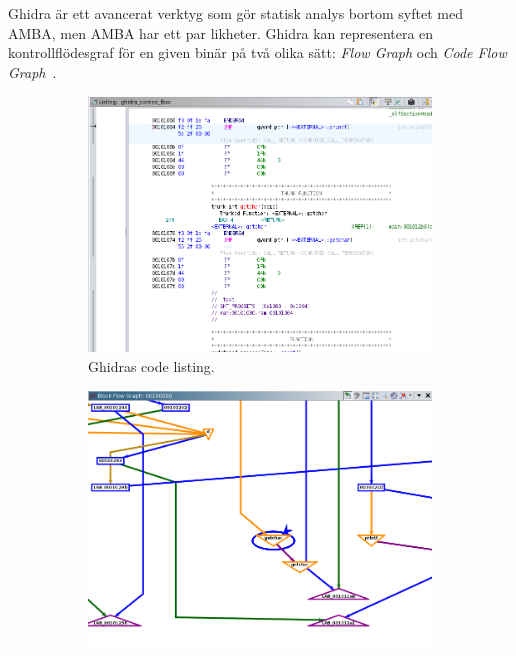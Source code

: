 Ghidra är ett avancerat verktyg som gör statisk analys bortom syftet med AMBA,
men AMBA har ett par likheter. Ghidra kan representera en kontrollflödesgraf
för en given binär på två olika sätt: \textit{Flow Graph} och \textit{Code Flow
Graph}~\cite{ghidra_website}.

\begin{figure}[H]
    \begin{subfigure}{0.3\textwidth}
        \includegraphics[width=\linewidth]{figures/ghidra_code_listing.png}
        \caption{Ghidras code listing.} \label{fig:ghidra_code_listing}
    \end{subfigure}
    \hspace*{\fill}
    \begin{subfigure}{0.3\textwidth}
        \includegraphics[width=\linewidth]{figures/ghidra_block_flow_graph.png}

\end{subfigure}
\end{figure}
